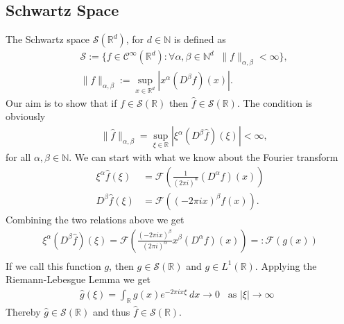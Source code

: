\subsection{Schwartz Space}
The Schwartz space $\mathcal{S}(\mathbb{R}^d)$, for $d \in \mathbb{N}$ is
defined as
\begin{align}
    &\mathcal{S} :=
\bigg\{
    f\in\mathcal{C}^\infty(\mathbb{R}^d):
    \forall\alpha,\beta\in\mathbb{N}^d\;\; \lVert f \rVert_{\alpha,\beta}
    < \infty
\bigg\},\\
&\lVert f \rVert_{\alpha, \beta} :=
\sup_{x\in\mathbb{R}^d}\left|x^\alpha (D^\beta f) (x) \right|.
\end{align}
Our aim is to show that if $f\in\mathcal{S}(\mathbb{R})$ then $\hat{f} \in
\mathcal{S}(\mathbb{R})$. The condition is obviously
\begin{align}
    &\lVert \hat{f} \rVert_{\alpha, \beta} =
    \sup_{\xi\in\mathbb{R}}\left|\xi^\alpha (D^\beta \hat{f}) (\xi)
    \right|<\infty,
\end{align}
for all $\alpha, \beta \in \mathbb{N}$.
We can start with what we know about the Fourier transform
\begin{align}
    \xi^\alpha \hat{f}(\xi) &= \mathcal{F}\left(\frac{1}{(2\pi
    i)^\alpha}(D^{\alpha}f)(x)\right)\\
            D^{\beta}\hat{f}(\xi) &= \mathcal{F}\left(
        (-2\pi i x)^\beta f(x)
    \right).
\end{align}
Combining the two relations above we get
\begin{align}
    \xi^\alpha (D^\beta \hat{f})(\xi) =
    \mathcal{F}\left(\frac{(-2\pi i x)^\beta}{(2\pi
    i)^\alpha}x^\beta(D^{\alpha}f)(x)\right)=: \mathcal{F}(g(x))\\
\end{align}
If we call this function $g$, then $g\in\mathcal{S}(\mathbb{R})$ and
$g\in L^1(\mathbb{R})$. Applying the Riemann-Lebesgue Lemma we get
\begin{align}
    \hat{g}(\xi) = \int_\mathbb{R} g(x) e^{-2\pi i x \xi}\ dx \longrightarrow 0
    \;\;\;  \text{as $|\xi| \rightarrow \infty$ }
\end{align}
Thereby $\hat{g} \in \mathcal{S}(\mathbb{R})$ and thus $\hat{f} \in
\mathcal{S}(\mathbb{R})$.

